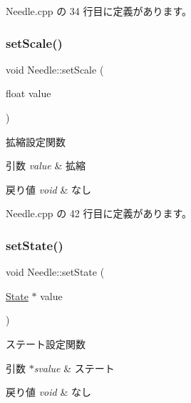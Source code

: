  Needle.\+cpp の 34 行目に定義があります。

\mbox{\label{class_needle_a496ac6f8e6bc0b6ea639cfe1294ee4ea}} 
\subsubsection{\texorpdfstring{set\+Scale()}{setScale()}}
{\footnotesize\ttfamily void Needle\+::set\+Scale (\begin{DoxyParamCaption}\item[{float}]{value }\end{DoxyParamCaption})}



拡縮設定関数 


\begin{DoxyParams}{引数}
{\em value} & 拡縮 \\
\hline
\end{DoxyParams}

\begin{DoxyRetVals}{戻り値}
{\em void} & なし \\
\hline
\end{DoxyRetVals}


 Needle.\+cpp の 42 行目に定義があります。

\mbox{\label{class_needle_a76b35c7ddffb5de4c44daa66e5927baa}} 
\subsubsection{\texorpdfstring{set\+State()}{setState()}}
{\footnotesize\ttfamily void Needle\+::set\+State (\begin{DoxyParamCaption}\item[{\mbox{\hyperlink{class_needle_1_1_state}{State}} $\ast$}]{value }\end{DoxyParamCaption})}



ステート設定関数 


\begin{DoxyParams}{引数}
{\em $\ast$svalue} & ステート \\
\hline
\end{DoxyParams}

\begin{DoxyRetVals}{戻り値}
{\em void} & なし \\
\hline
\end{DoxyRetVals}


